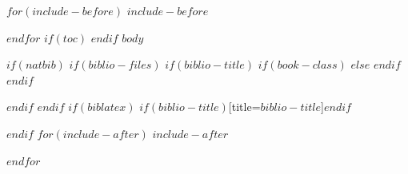 \documentclass[$if(fontsize)$$fontsize$,$endif$$if(lang)$$lang$,$endif$]{$documentclass$}
\begin{document}
$for(include-before)$
$include-before$

$endfor$
$if(toc)$
{
\hypersetup{linkcolor=black}
\setcounter{tocdepth}{$toc-depth$}
\tableofcontents
\pagebreak
}
$endif$
$body$

$if(natbib)$
$if(biblio-files)$
$if(biblio-title)$
$if(book-class)$
\renewcommand\bibname{$biblio-title$}
$else$
\renewcommand\refname{$biblio-title$}
$endif$
$endif$


$endif$
$endif$
$if(biblatex)$
\printbibliography$if(biblio-title)$[title=$biblio-title$]$endif$

$endif$
$for(include-after)$
$include-after$

$endfor$
\end{document}
